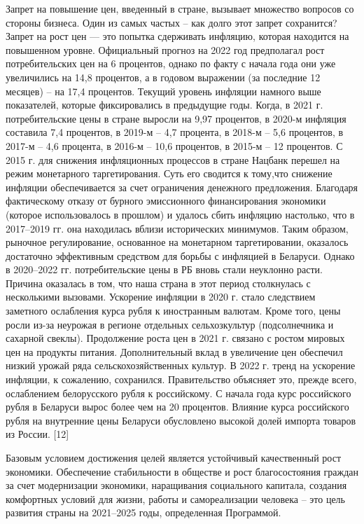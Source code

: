 \documentclass[14pt,a4paper]{article}
\begin{document}
    \par
    Запрет на повышение цен, введенный в стране, вызывает множество вопросов со стороны бизнеса.
    Один из самых частых – как долго этот запрет сохранится?
    Запрет на рост цен — это попытка сдерживать инфляцию, которая находится на повышенном уровне.
    Официальный прогноз на 2022 год предполагал рост потребительских цен на 6 процентов, однако по факту с начала года они уже увеличились на 14,8 процентов, а в годовом выражении (за последние 12 месяцев) – на 17,4 процентов.
    Текущий уровень инфляции намного выше показателей, которые фиксировались в предыдущие годы.
    Когда, в 2021 г. потребительские цены в стране выросли на 9,97 процентов, в 2020-м инфляция составила 7,4 процентов, в 2019-м – 4,7 процента, в 2018-м – 5,6 процентов, в 2017-м – 4,6 процента, в 2016-м – 10,6 процентов, в 2015-м – 12 процентов.
    С 2015 г. для снижения инфляционных процессов в стране Нацбанк перешел на режим монетарного таргетирования.
    Суть его сводится к тому,что снижение инфляции обеспечивается за счет ограничения денежного предложения.
    Благодаря фактическому отказу от бурного эмиссионного финансирования экономики (которое использовалось в прошлом) и удалось сбить инфляцию настолько, что в 2017–2019 гг. она находилась вблизи исторических минимумов.
    Таким образом, рыночное регулирование, основанное на монетарном таргетировании, оказалось достаточно эффективным средством для борьбы с инфляцией в Беларуси.
    Однако в 2020–2022 гг. потребительские цены в РБ вновь стали неуклонно расти. Причина оказалась в том, что наша страна в этот период столкнулась с несколькими вызовами.
    Ускорение инфляции в 2020 г. стало следствием заметного ослабления курса рубля к иностранным валютам.
    Кроме того, цены росли из-за неурожая в регионе отдельных сельхозкультур (подсолнечника и сахарной свеклы).
    Продолжение роста цен в 2021 г. связано с ростом мировых цен на продукты питания.
    Дополнительный вклад в увеличение цен обеспечил низкий урожай ряда сельскохозяйственных культур.
    В 2022 г. тренд на ускорение инфляции, к сожалению, сохранился.
    Правительство объясняет это, прежде всего, ослаблением белорусского рубля к российскому.
    С начала года курс российского рубля в Беларуси вырос более чем на 20 процентов.
    Влияние курса российского рубля на внутренние цены Беларуси обусловлено высокой долей импорта товаров из России.
    [12]
    \par
    Базовым условием достижения целей является устойчивый качественный рост экономики.
    Обеспечение стабильности в обществе и рост благосостояния граждан за счет модернизации экономики, наращивания социального капитала, создания комфортных условий для жизни, работы и самореализации человека – это цель развития страны на 2021–2025 годы, определенная Программой.
\end{document}
